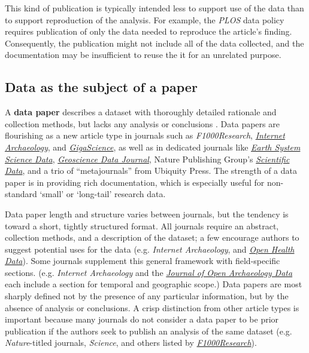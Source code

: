 \documentclass[10pt,a4paper,twocolumn]{article}
\begin{document}
{This kind of publication is typically intended less to support use of the data than to support reproduction of the analysis.
For example, the \emph{PLOS} data policy requires publication of only the data needed to reproduce the article's finding.
Consequently, the publication might not include all of the data collected, and the documentation may be insufficient to reuse the it for an unrelated purpose.
 
\subsection*{Data as the subject of a paper}\label{paper-subject-data}

A \textbf{data paper} describes a dataset with thoroughly detailed rationale and collection methods, but lacks any analysis or conclusions \cite{newman_data_2009}.
Data papers are flourishing as a new article type in journals such as \emph{F1000Research}, \href{http://www.internetarchaeology.org/}{\emph{Internet Archaeology}}, and \href{http://www.gigasciencejournal.com/}{\emph{GigaScience}}, as well as in dedicated journals like \href{http://www.earth-system-science-data.net/}{\emph{Earth System Science Data}}\cite{pfeiffenberger_earth_2011}, \href{http://onlinelibrary.wiley.com/journal/10.1002/%28ISSN%292049-6060}{\emph{Geoscience Data Journal}}, Nature Publishing Group's \href{http://www.nature.com/scientificdata/}{\emph{Scientific Data}}, and a trio of ``metajournals'' from Ubiquity Press.
The strength of a data paper is in providing rich documentation, which is especially useful for non-standard `small' or `long-tail' research data.

Data paper length and structure varies between journals, but the tendency is toward a short, tightly structured format.
All journals require an abstract, collection methods, and a description of the dataset; a few encourage authors to suggest potential uses for the data (e.g. \emph{Internet Archaeology}, and \href{http://openhealthdata.metajnl.com/about/submissions#authorGuidelines}{\emph{Open Health Data}}).
Some journals supplement this general framework with field-specific sections. 
(e.g. \emph{Internet Archaeology} and the \href{http://openarchaeologydata.metajnl.com/}{\emph{Journal of Open Archaeology Data}} each include a section for temporal and geographic scope.)
Data papers are most sharply defined not by the presence of any particular information, but by the absence of analysis or conclusions.
A crisp distinction from other article types is important because many journals do not consider a data paper to be prior publication if the authors seek to publish an analysis of the same dataset (e.g. \textit{Nature}-titled journals, \emph{Science}, and others listed by \href{https://f1000research.com/data-policies}{\textit{F1000Research}}).

}
\end{document}
